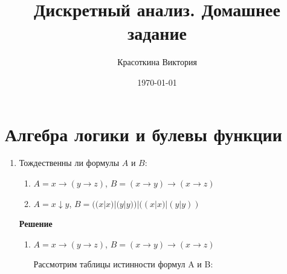 \documentclass[12pt]{article}
\author{Красоткина Виктория}
\title{Дискретный анализ. Домашнее задание}
\date{\today}
\begin{document}
		
		\maketitle
		\thispagestyle{empty}
		\newpage
		
	\section{Алгебра логики и булевы функции}
	\begin{enumerate}[label={\textbf{\arabic{section}.\arabic*}}]
		\item Тождественны ли формулы $A$ и $B$:
		\begin{enumerate}[label=\textbf{\alph*)}]
			\item $A = x\rightarrow (y\rightarrow z)$, $B = (x\rightarrow y)\rightarrow(x\rightarrow z)$
			\item $A = x\downarrow y$, $B = ((x|x)|(y|y))|((x|x)|(y|y))$
		\end{enumerate}
		\textbf{Решение}
		\begin{enumerate}[label=\textbf{\alph*)}]
			\item $A = x \rightarrow (y \rightarrow z)$, $B = (x \rightarrow y) \rightarrow (x \rightarrow z)$
			
			Рассмотрим таблицы истинности формул A и B:
			

\end{enumerate}
\end{enumerate}
\end{document}
